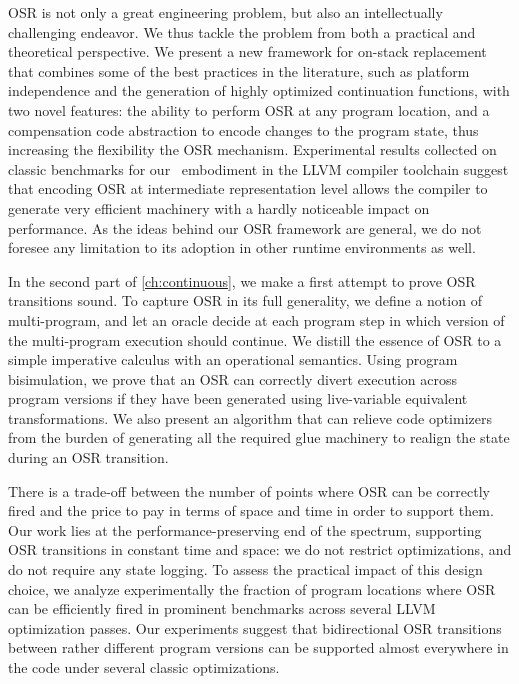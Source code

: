 OSR is not only a great engineering problem, but also an intellectually challenging endeavor. We thus tackle the problem from both a practical and theoretical perspective. We present a new framework for on-stack replacement that combines some of the best practices in the literature, such as platform independence and the generation of highly optimized continuation functions, with two novel features: the ability to perform OSR at any program location, and a compensation code abstraction to encode changes to the program state, thus increasing the flexibility the OSR mechanism. Experimental results collected on classic benchmarks for our \osrkit\ embodiment in the LLVM compiler toolchain suggest that encoding OSR at intermediate representation level allows the compiler to generate very efficient machinery with a hardly noticeable impact on performance. As the ideas behind our OSR framework are general, we do not foresee any limitation to its adoption in other runtime environments as well.

In the second part of \mychapter\ref{ch:continuous}, we make a first attempt to prove OSR transitions sound. To capture OSR in its full generality, we define a notion of multi-program, and let an oracle decide at each program step in which version of the multi-program execution should continue. We distill the essence of OSR to a simple imperative calculus with an operational semantics. Using program bisimulation, we prove that an OSR can correctly divert execution across program versions if they have been generated using live-variable equivalent transformations. We also present an algorithm that can relieve code optimizers from the burden of generating all the required glue machinery to realign the state during an OSR transition.

There is a trade-off between the number of points where OSR can be correctly fired and the price to pay in terms of space and time in order to support them. Our work lies at the performance-preserving end of the spectrum, supporting OSR transitions in constant time and space: we do not restrict optimizations, and do not require any state logging. To assess the practical impact of this design choice, we analyze experimentally the fraction of program locations where OSR can be efficiently fired in prominent benchmarks across several LLVM optimization passes. Our experiments suggest that bidirectional OSR transitions between rather different program versions can be supported almost everywhere in the code under several classic optimizations.

